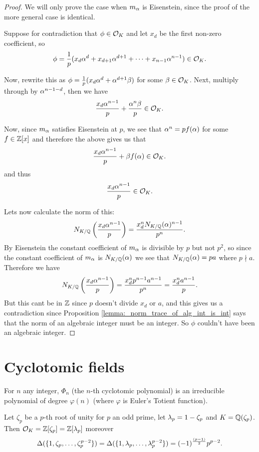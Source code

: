 \begin{proof}
	We will only prove the case when $m_\alpha$ is Eisenstein, since the proof of the more general case is identical.	
	
	Suppose for contradiction that $\phi \in \mathcal{O}_K$ and let $x_d$ be the first non-zero coefficient, so \[\phi=\frac{1}{p}(x_d\alpha^d+x_{d+1}\alpha^{d+1}+\cdots+x_{n-1}\alpha^{n-1}) \in \mathcal{O}_K.\]
	
	Now, rewrite this as $\phi=\frac{1}{p}(x_d\alpha^d +\alpha^{d+1}\beta)$ for some $\beta \in \mathcal{O}_K$. Next, multiply through by $\alpha^{n-1-d}$, then we have \[\frac{x_d\alpha^{n-1}}{p}+\frac{\alpha^n\beta}{p} \in \mathcal{O}_K.\]
	
	Now, since  $m_\alpha$ satisfies Eisenstein at $p$, we see that $\alpha^n=pf(\alpha)$ for some $f \in \mathbb{Z}[x]$ and therefore the above gives us that \[\frac{x_d\alpha^{n-1}}{p}+\beta f(\alpha) \in \mathcal{O}_K.\] and thus \[\frac{x_d\alpha^{n-1}}{p} \in \mathcal{O}_K.\]
	
	Lets now calculate the norm of this: \[N_{K/\mathbb{Q}} \left(\frac{x_d\alpha^{n-1}}{p} \right)=\frac{x_d^n N_{K/\mathbb{Q}}(\alpha)^{n-1}}{p^n}.\] By Eisenstein the constant coefficient of $m_\alpha$ is divisible by $p$ but not $p^2$, so since the constant coefficient of $m_\alpha$ is $N_{K/\mathbb{Q}}(\alpha)$ we see that $N_{K/\mathbb{Q}}(\alpha)=p a$ where $p \nmid a$. Therefore we have \[N_{K/\mathbb{Q}} \left(\frac{x_d\alpha^{n-1}}{p} \right)=\frac{x_d^n p^{n-1}a^{n-1}}{p^n}= \frac{x_d^n a^{n-1}}{p}.\] But this cant be in $\mathbb{Z}$ since $p$ doesn't divide $x_d$ or $a$, and this gives us a contradiction since  Proposition \ref{lemma:_norm_trace_of_alg_int_is_int} says that the norm of an algebraic integer must be an integer. So $\phi$ couldn't have been an algebraic integer. 
	
	
\end{proof}	

\section{Cyclotomic fields}


\begin{lemma}\label{lemma:_cyclo_poly}
	For $n$ any integer, $\Phi_n$ (the $n$-th cyclotomic polynomial) is an irreducible polynomial of degree $\varphi(n)$ (where $\varphi$ is Euler's Totient function).
\end{lemma}




\begin{theorem}\label{theorem:_ring_of_ints_of_cyclo}
	Let $\zeta_p$ be a $p$-th root of unity for $p$ an odd prime, let $\lambda_p=1-\zeta_p$ and $K=\mathbb{Q}(\zeta_p)$. Then $\mathcal{O}_K=\mathbb{Z}[\zeta_p]=\mathbb{Z}[\lambda_p]$ moreover \[\Delta(\{1,\zeta_p,\dots,\zeta_p^{p-2}\})=\Delta(\{1,\lambda_p,\dots,\lambda_p^{p-2}\})=(-1)^{\frac{(p-1)}{2}}p^{p-2}.\]
\end{theorem}	

